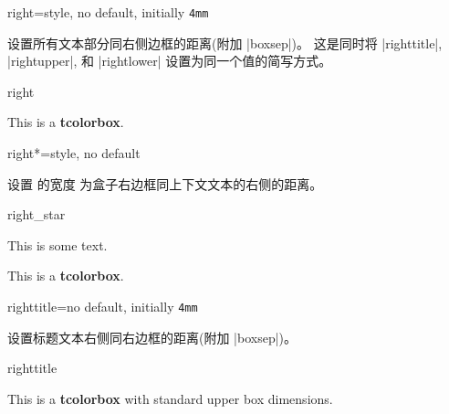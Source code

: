 \begin{docTcbKey}{right}{=}{style, no default, initially \texttt{4mm}}

设置所有文本部分同右侧边框的距离(附加 |boxsep|)。
这是同时将 |righttitle|, |rightupper|, 和 |rightlower| 设置为同一个值的简写方式。
\begin{exdispExample}{right}

\begin{tcolorbox}[width=5cm,right=2cm]
This is a \textbf{tcolorbox}.
\end{tcolorbox}
\end{exdispExample}
\end{docTcbKey}





  
\begin{docTcbKey}[][doc new=2017-02-16]{right*}{=}{style, no default}

设置  的宽度  为盒子右边框同上下文文本的右侧的距离。
\begin{exdispExample}{right_star}

\flushright This is some text.
\begin{tcolorbox}[grow to right by=5mm,right*=0mm,
  halign=right,enhanced,show bounding box]
This is a \textbf{tcolorbox}.
\end{tcolorbox}
\end{exdispExample}
\end{docTcbKey}



\begin{docTcbKey}{righttitle}{=}{no default, initially \texttt{4mm}}

设置标题文本右侧同右边框的距离(附加 |boxsep|)。
  \begin{exdispExample}{righttitle}

\begin{tcolorbox}[width=5cm,righttitle=2cm,title=My very long title text]
This is a \textbf{tcolorbox} with standard upper box dimensions.
\end{tcolorbox}
\end{exdispExample}
\end{docTcbKey}


